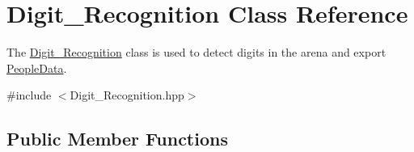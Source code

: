 \hypertarget{class_digit___recognition}{}\section{Digit\+\_\+\+Recognition Class Reference}
\label{class_digit___recognition}


The \mbox{\hyperlink{class_digit___recognition}{Digit\+\_\+\+Recognition}} class is used to detect digits in the arena and export \mbox{\hyperlink{struct_people_data}{People\+Data}}.  




{\ttfamily \#include $<$Digit\+\_\+\+Recognition.\+hpp$>$}

\subsection*{Public Member Functions}
